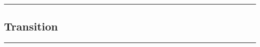 \documentclass[a4paper,12pt]{article}
\begin{document}
\vspace{0em} %
\hrule height 1pt width 1\textwidth %
\vspace{1em} %




\subsection{Transition}

\vspace{1em} %
\hrule height 1pt width 1\textwidth %
\vspace{1em} %
\end{document}
